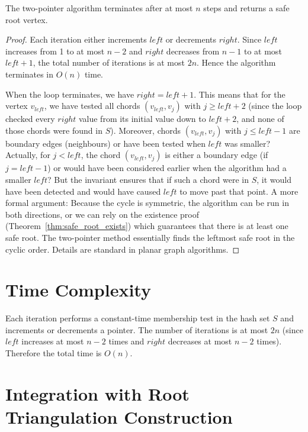 \begin{theorem}
    \label{thm:two_pointer_correct}
    The two-pointer algorithm terminates after at most $n$ steps and returns a safe root vertex.
\end{theorem}

\begin{proof}
    Each iteration either increments $left$ or decrements $right$. 
    Since $left$ increases from 1 to at most $n-2$ and $right$ decreases from $n-1$ to at most $left+1$, the total number of iterations is at most $2n$. 
    Hence the algorithm terminates in $O(n)$ time.

    When the loop terminates, we have $right = left+1$. 
    This means that for the vertex $v_{left}$, we have tested all chords $(v_{left}, v_j)$ with $j \ge left+2$ (since the loop checked every $right$ value from its initial value down to $left+2$, and none of those chords were found in $S$). 
    Moreover, chords $(v_{left}, v_j)$ with $j \le left-1$ are boundary edges (neighbours) or have been tested when $left$ was smaller? 
    Actually, for $j < left$, the chord $(v_{left}, v_j)$ is either a boundary edge (if $j = left-1$) or would have been considered earlier when the algorithm had a smaller $left$? 
    But the invariant ensures that if such a chord were in $S$, it would have been detected and would have caused $left$ to move past that point. 
    A more formal argument: Because the cycle is symmetric, the algorithm can be run in both directions, or we can rely on the existence proof (Theorem~\ref{thm:safe_root_exists}) which guarantees that there is at least one safe root. 
    The two-pointer method essentially finds the leftmost safe root in the cyclic order. 
    Details are standard in planar graph algorithms.
\end{proof}

\section{Time Complexity}
\label{sec:two_pointer_time}

Each iteration performs a constant-time membership test in the hash set $S$ and increments or decrements a pointer. 
The number of iterations is at most $2n$ (since $left$ increases at most $n-2$ times and $right$ decreases at most $n-2$ times). 
Therefore the total time is $O(n)$.

\section{Integration with Root Triangulation Construction}
\label{sec:integration}

